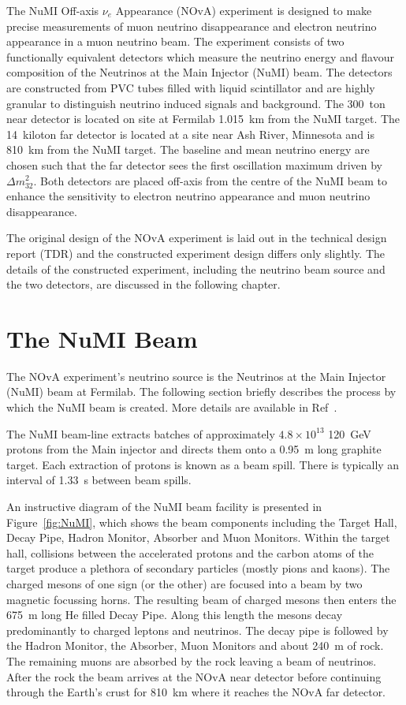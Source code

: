 
The NuMI Off-axis $\nu_e$ Appearance (NOvA) experiment 
is designed to make precise measurements of muon neutrino
disappearance and electron neutrino appearance in a muon neutrino
beam.  
The experiment consists of two functionally equivalent
detectors which measure the neutrino energy and flavour composition of 
the Neutrinos at the Main Injector (NuMI) beam. 
The detectors are constructed from PVC tubes filled with liquid
scintillator and are highly granular to distinguish neutrino induced
signals and background.
The 300~ton near detector is located on site at Fermilab 1.015~km  
from the NuMI target. The 14~kiloton far detector is located at a site
near Ash River, Minnesota and is 810~km from the NuMI target. 
The baseline and mean neutrino energy are chosen such that the far
detector sees the first oscillation maximum driven by $\Delta
m_{32}^2$. 
Both detectors are placed off-axis from the centre
of the NuMI beam to enhance the sensitivity to electron neutrino
appearance and muon neutrino disappearance.

The original design of the NOvA experiment is laid out in the
technical design report (TDR) \cite{TDR} and the constructed experiment
design differs only slightly. The details
of the constructed experiment, including the neutrino beam source and
the two detectors, are discussed in the following chapter.


\section{The NuMI Beam}

The NOvA experiment's neutrino source is the Neutrinos at
the Main Injector (NuMI) beam at Fermilab. The following section
briefly describes the process by which the NuMI beam is
created. More details are available in Ref~\cite{NuMI}.

The NuMI beam-line extracts batches of approximately $4.8 \times
10^{13}$ 120~GeV protons from the Main
injector and directs them onto a 0.95~m long graphite
target. Each extraction of protons is known as a beam spill. There is
typically an interval of 1.33~s between beam spills.

An instructive diagram of the NuMI beam facility is presented in
Figure~\ref{fig:NuMI}, which shows the beam components including the 
Target Hall, Decay Pipe, Hadron Monitor, Absorber and Muon Monitors. 
Within the target hall, collisions between the accelerated protons and
the carbon atoms of the 
target produce a plethora of secondary particles (mostly pions and
kaons). The charged mesons of one sign (or the other) are focused into
a beam by two magnetic focussing horns. 
The resulting beam of charged mesons then enters the 675~m long He
filled Decay Pipe. Along this length the 
mesons decay predominantly to charged leptons and neutrinos. 
The decay pipe is followed by the Hadron Monitor, the Absorber, Muon
Monitors and about 240~m of rock. 
The remaining
muons are absorbed by the rock leaving a beam of
neutrinos. After the rock the beam 
arrives at the NOvA near detector before continuing through the
Earth's crust for 810~km where it reaches the NOvA far detector.

